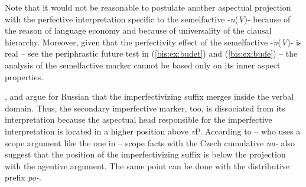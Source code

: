 \documentclass[output=paper]{langscibook}
\begin{document}
Note that it would not be reasonable to postulate another aspectual projection with the perfective interpretation specific to the semelfactive -\textit{n}(\textit{V})- because of the reason of language economy and because of universality of the clausal hierarchy. Moreover, given that the perfectivity effect of the semelfactive -\textit{n}(\textit{V})- is real – see the periphrastic future test in (\ref{bis:ex:budet}) and (\ref{bis:ex:bude}) – the analysis of the semelfactive marker cannot be based only on its inner aspect properties.

\ea\label{bis:ex:budet}
\z
\z

\ea\label{bis:ex:bude}
\z
\z

\noindent \citet{Romanova2004}, \citet{Tatevosov2015Slavic} and \citet{Mueller-Reichau2020} argue for Russian that the imperfectivizing suffix merges inside the verbal domain. Thus, the secondary imperfective marker, too, is dissociated from its interpretation because the aspectual head responsible for the imperfective interpretation is located in a higher position above \textit{v}P. According to \citet{Biskup2020} -- who uses a scope argument like the one in \citet{Tatevosov2015Slavic} -- scope facts with the Czech cumulative \textit{na-} also suggest that the position of the imperfectivizing suffix is below the projection with the agentive argument. The same point can be done with the distributive prefix \textit{po-}.\largerpage[1]
\end{document}

